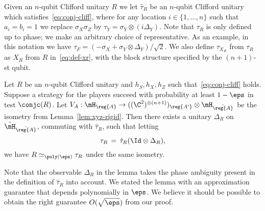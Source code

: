 Given an $n$-qubit  Clifford unitary $R$ we let $\hat{\tau}_R$ be an $n$-qubit Clifford unitary which satisfies~\eqref{eq:conj-cliff}, where for any location $i\in\{1,\ldots,n\}$ such that $a_i=b_i=1$ we replace $\sigma_X\sigma_Z$ by $\tau_Y = \sigma_Y \otimes (i\Delta_Y)$. Note that $\tau_R$ is only defined up to phase; we make an arbitrary choice of representative. As an example, in this notation we have $\tau_F = (-\sigma_X + \sigma_Y \otimes \Delta_Y)/\sqrt{2}$. We also define $\tau_{X_R}$ from $\tau_R$ as $X_R$ from $R$ in~\eqref{eq:def-xr}, with the block structure specified by the $(n+1)$-st qubit. 


\begin{lemma}\label{lem:cliff-conj}
Let $R$ be an $n$-qubit Clifford unitary and $h_S,h_X,h_Z$ such that~\eqref{eq:conj-cliff} holds. Suppose a strategy for the players succeed with probability at least $1-\eps$ in test $\conjc(R)$. Let $V_A:\mH_\reg{A} \to ((\C^2)^{\otimes (n+1)})_{\reg{A'}}  \otimes {\mH}_{\hat{\reg{A}}}$ be the isometry from Lemma~\ref{lem:xyz-rigid}.  
Then there exists a unitary $\Delta_R$ on $\hat{\mH}_{\hat{\reg{A}}}$, commuting with $\hat{\tau}_R$, such that letting  
$$ \tau_R \,=\, \hat{\tau}_{R}(\Id \otimes \Delta_R),$$
we have $R \simeq_{\poly(\eps)} \tau_R$ under the same isometry. 
\end{lemma}

Note that the observable $\Delta_R$ in the lemma takes the phase ambiguity present in the definition of $\hat{\tau}_R$ into account. 
 We stated the lemma with an approximation guarantee that depends polynomially in $\eps$. We believe it should be possible to obtain the right guarantee $O(\sqrt{\eps})$ from our proof. 

